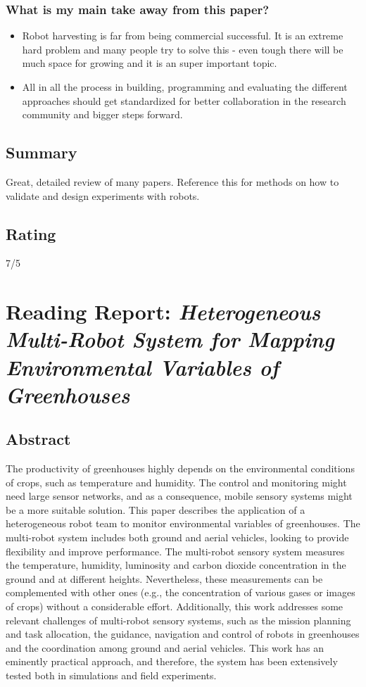     \subsubsection*{What is my main take away from this paper?}
    \begin{itemize}
        \item Robot harvesting is far from being commercial successful. It is an extreme hard problem and many people try to solve this - even tough there will be much space for growing and it is an super important topic.
        \item All in all the process in building, programming and evaluating the different approaches should get standardized for better collaboration in the research community and bigger steps forward.
    \end{itemize}
    
    \subsection*{Summary}
    Great, detailed review of many papers. Reference this for methods on how to validate and design experiments with robots.
    \subsection*{Rating}
    7/5
    
    
    \newpage
    
    \section{Reading Report: \emph{Heterogeneous Multi-Robot System for Mapping Environmental Variables of Greenhouses}}
    \cite{Roldan2016}
    
    \subsection*{Abstract}
    The productivity of greenhouses highly depends on the environmental conditions of crops,
    such as temperature and humidity. The control and monitoring might need large sensor networks,
    and as a consequence, mobile sensory systems might be a more suitable solution. This paper describes
    the application of a heterogeneous robot team to monitor environmental variables of greenhouses.
    The multi-robot system includes both ground and aerial vehicles, looking to provide flexibility
    and improve performance. The multi-robot sensory system measures the temperature, humidity,
    luminosity and carbon dioxide concentration in the ground and at different heights. Nevertheless,
    these measurements can be complemented with other ones (e.g., the concentration of various
    gases or images of crops) without a considerable effort. Additionally, this work addresses some
    relevant challenges of multi-robot sensory systems, such as the mission planning and task allocation,
    the guidance, navigation and control of robots in greenhouses and the coordination among ground
    and aerial vehicles. This work has an eminently practical approach, and therefore, the system has
    been extensively tested both in simulations and field experiments.
    
